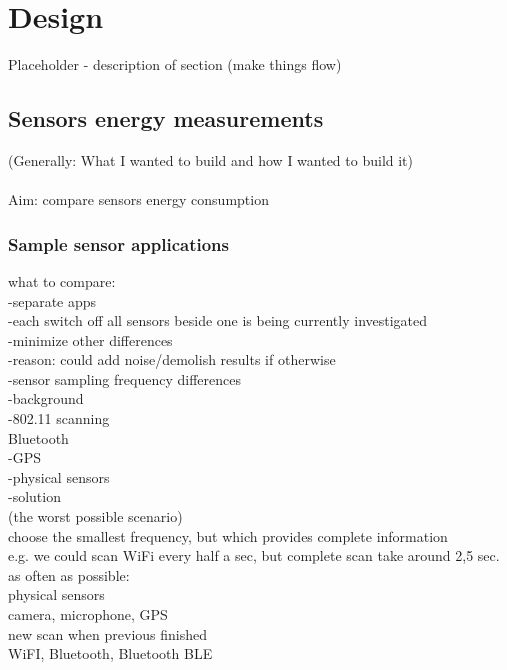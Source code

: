 \section{Design}
\label{s:design}
Placeholder - description of section (make things flow)\\
\subsection{Sensors energy measurements}

(Generally: What I wanted to build and how I wanted to build it)\\
\\
Aim: compare sensors energy consumption\\

\subsubsection{Sample sensor applications}
what to compare:\\
	-separate apps\\
	-each switch off all sensors beside one is being currently investigated\\
	-minimize other differences \\
		-reason: could add noise/demolish results  if otherwise\\
		
		
		-sensor sampling frequency differences\\
			-background\\
				-802.11 scanning\\
					Bluetooth\\
				-GPS\\
				-physical sensors\\
			-solution\\
				(the worst possible scenario)\\
				choose the smallest frequency, but which provides complete information\\
					e.g. we could scan WiFi every half a sec, but complete scan take around 2,5 sec.\\
				as often as possible:\\
					physical sensors\\
					camera, microphone, GPS\\	
				new scan when previous finished\\
					WiFI, Bluetooth, Bluetooth BLE\\
					

